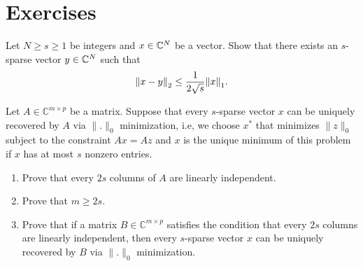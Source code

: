 \section*{Exercises}

\begin{myexercise}\label{prob:sparse_vector_approx}
    Let $N \geq s \geq 1$ be integers and $x \in \mathbb{C}^N$ be a vector. Show that there exists an $s$-sparse vector $y \in \mathbb{C}^N$ such that
    \begin{equation*}
        {\left\lVert{x - y}\right\rVert}_2 \leq \frac{1}{2\sqrt{s}}{\left\lVert{x}\right\rVert}_1.
    \end{equation*}
\end{myexercise}

\begin{myexercise}\label{prob:l0_minimization}
    
    Let $A \in \mathbb{C}^{m\times p}$ be a matrix. Suppose that every $s$-sparse vector $x$ can be uniquely recovered by $A$ via $\|.\|_0$ minimization, i.e, we choose $x^{\ast}$ that minimizes $\|z\|_{0}$ subject to the constraint $Ax=Az$ and $x$ is the unique minimum of this problem if $x$ has at most $s$ nonzero entries.
    \begin{enumerate}
        \item Prove that every $2s$ columns of $A$ are linearly independent.
        
        \item Prove that $m\ge 2s$.
        
        \item Prove that if a matrix $B\in \mathbb{C}^{m\times p}$ satisfies the condition that every $2s$ columns are linearly independent, then every $s$-sparse vector $x$ can be uniquely recovered by $B$ via $\|.\|_0$ minimization.

    \end{enumerate}

\end{myexercise}

